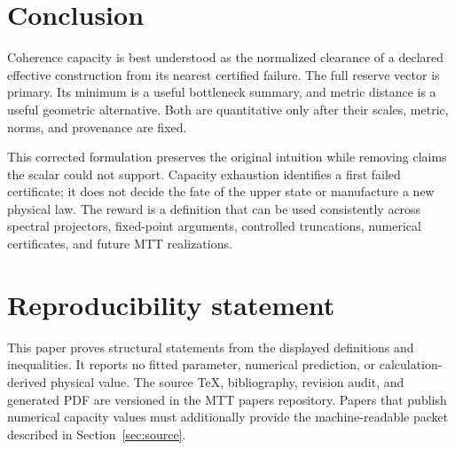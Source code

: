 \documentclass[11pt]{article}
\theoremstyle{definition}
\theoremstyle{remark}
\begin{document}
\section{Conclusion}
\label{sec:conclusion}

Coherence capacity is best understood as the normalized clearance of a
declared effective construction from its nearest certified failure.
The full reserve vector is primary.  Its minimum is a useful bottleneck
summary, and metric distance is a useful geometric alternative.  Both are
quantitative only after their scales, metric, norms, and provenance are
fixed.

This corrected formulation preserves the original intuition while removing
claims the scalar could not support.  Capacity exhaustion identifies a
first failed certificate; it does not decide the fate of the upper state or
manufacture a new physical law.  The reward is a definition that can be
used consistently across spectral projectors, fixed-point arguments,
controlled truncations, numerical certificates, and future MTT
realizations.

\section*{Reproducibility statement}

This paper proves structural statements from the displayed definitions and
inequalities.  It reports no fitted parameter, numerical prediction, or
calculation-derived physical value.  The source TeX, bibliography, revision
audit, and generated PDF are versioned in the MTT papers repository.  Papers
that publish numerical capacity values must additionally provide the
machine-readable packet described in Section~\ref{sec:source}.



\end{document}
